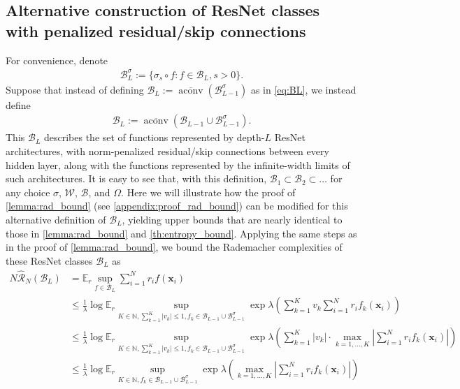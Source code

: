 \documentclass{article}
\DeclareMathOperator{\aconv}{\mathrm{aconv}}
\def\vx{{\bm{x}}}
\def\cB{{\mathcal{B}}}
\def\cR{{\mathcal{R}}}
\def\cW{{\mathcal{W}}}
\def\bE{{\mathbb{E}}}
\def\bN{{\mathbb{N}}}
\begin{document}
\begin{appendices}
\subsection{Alternative construction of ResNet classes with penalized residual/skip connections} \label{appendix:resnet_classes}
For convenience, denote
\begin{align}
\cB_L^{\sigma} := \{ \sigma_s \circ f: f \in \cB_L, s > 0 \}.
\end{align}
Suppose that instead of defining $\cB_L := \overline{\aconv}(\cB_{L-1}^\sigma)$ as in \eqref{eq:BL}, we instead define
    \begin{align} \label{eq:B_L_resnet_def}
        \cB_L := \overline{\aconv}( \cB_{L-1} \cup \cB_{L-1}^\sigma).
    \end{align}
    This $\cB_L$ describes the set of functions represented by depth-$L$ ResNet architectures, with norm-penalized residual/skip connections between every hidden layer, along with the functions represented by the infinite-width limits of such architectures. It is easy to see that, with this definition, $\cB_1 \subset \cB_2 \subset \dots$ for any choice $\sigma$, $\cW$, $\cB$, and $\Omega$. Here we will illustrate how the proof of \cref{lemma:rad_bound} (see \cref{appendix:proof_rad_bound}) can be modified for this alternative definition of $\cB_L$, yielding upper bounds that are nearly identical to those in \cref{lemma:rad_bound} and \cref{th:entropy_bound}. Applying the same steps as in the proof of \cref{lemma:rad_bound}, we bound the Rademacher complexities of these ResNet classes $\cB_L$ as
   \begin{align} 
        N \widehat{\cR}_N(\cB_L) &= \bE_r \sup_{f \in \cB_L} \sum_{i=1}^N r_i f(\vx_i)  \\
        &\leq \frac{1}{\lambda} \log \bE_r \sup_{K \in \bN, \sum_{k=1}^K |v_k|  \leq 1, f_k \in \cB_{L-1} \cup \cB_{L-1}^\sigma} \exp \lambda \left( \sum_{k=1}^K v_k \sum_{i=1}^N r_i  f_k(\vx_i) \right) \label{eq:rad_bound_init_resnet} \\
        &\leq \frac{1}{\lambda} \log \bE_r \sup_{K \in \bN, \sum_{k=1}^K |v_k| \leq 1, f_k \in \cB_{L-1} \cup \cB_{L-1}^\sigma} \exp \lambda \left(  \sum_{k=1}^K |v_k| \cdot \max_{k=1, \dots, K} \left| \sum_{i=1}^N r_i  f_k(\vx_i) \right| \right) \\
        &\leq \frac{1}{\lambda} \log \bE_r \sup_{K \in \bN, f_k \in \cB_{L-1} \cup \cB_{L-1}^\sigma} \exp \lambda \left( \max_{k=1, \dots, K} \left| \sum_{i=1}^N r_i  f_k(\vx_i) \right| \right) \\

\end{align}
\end{appendices}
\end{document}
